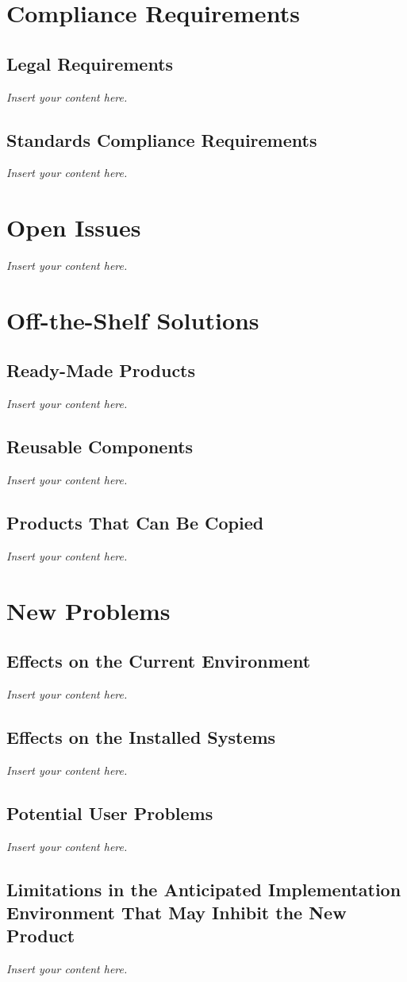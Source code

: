 \documentclass[a4paper, 12pt,twoside]{article}
\newcommand{\lips}{\textit{Insert your content here.}}
\begin{document}
\section{Compliance Requirements}
\subsection{Legal Requirements}
\lips
\subsection{Standards Compliance Requirements}
\lips

\section{Open Issues}
\lips

\section{Off-the-Shelf Solutions}
\subsection{Ready-Made Products}
\lips
\subsection{Reusable Components}
\lips
\subsection{Products That Can Be Copied}
\lips

\section{New Problems}
\subsection{Effects on the Current Environment}
\lips
\subsection{Effects on the Installed Systems}
\lips
\subsection{Potential User Problems}
\lips
\subsection{Limitations in the Anticipated Implementation Environment That May Inhibit the New Product}
\lips
\end{document}
